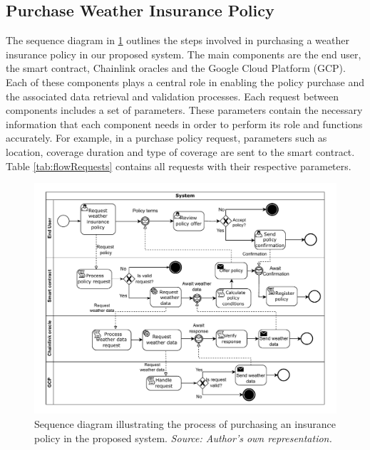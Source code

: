 \subsection{Purchase Weather Insurance Policy}\label{subsection:purchasePolicyFlow}
The sequence diagram in \cref{fig:purchasePolicyFlow} outlines the steps involved in purchasing a weather insurance policy in our proposed system. The main components are the end user, the smart contract, Chainlink oracles and the Google Cloud Platform (GCP). Each of these components plays a central role in enabling the policy purchase and the associated data retrieval and validation processes. Each request between components includes a set of parameters. These parameters contain the necessary information that each component needs in order to perform its role and functions accurately. For example, in a purchase policy request, parameters such as location, coverage duration and type of coverage are sent to the smart contract. Table \cref{tab:flowRequests} contains all requests with their respective parameters.

\begin{figure}[ht]
    \centering
    \includegraphics[width=1\textwidth]{figures/flow-purchase-policy.drawio.pdf}
    \caption{Sequence diagram illustrating the process of purchasing an insurance policy in the proposed system. \textit{Source: Author's own representation.}}
    \label{fig:purchasePolicyFlow}
\end{figure}

\begin{table}[ht]
    \centering
    
    \caption{Requests depicted in \cref{fig:purchasePolicyFlow} and their respective parameters. \textit{Source: Author's own representation.}}
    \label{tab:flowRequests}
\end{table}

